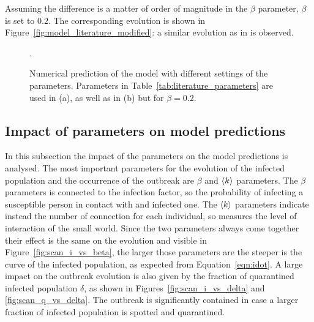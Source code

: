Assuming the difference is a matter of order of magnitude in the $\beta$ parameter, $\beta$ is set to $0.2$. The corresponding evolution is shown in Figure~\ref{fig:model_literature_modified}: a similar evolution as in \cite{MingLiu} is observed.

\begin{figure}[!ht]\centering
{}
\caption{Numerical prediction of the model with different settings of the parameters. Parameters in Table~\ref{tab:literature_parameters} are used in (a), as well as in (b) but for $\beta=0.2$.}.
\end{figure}


\subsection{Impact of parameters on model predictions}
In this subsection the impact of the parameters on the model predictions is analysed. The most important parameters for the evolution of the infected population and the occurrence of the outbreak are $\beta$ and $\braket{k}$ parameters. The $\beta$ parameters is connected to the infection factor, so the probability of infecting a susceptible person in contact with and infected one. The $\braket{k}$ parameters indicate instead the number of connection for each individual, so measures the level of interaction of the small world. Since the two parameters always come together their effect is the same on the evolution and visible in Figure~\ref{fig:scan_i_vs_beta}, the larger those parameters are the steeper is the curve of the infected population, as expected from Equation~\ref{eqn:idot}.  A large impact on the outbreak evolution is also given by the fraction of quarantined infected population $\delta$, as shown in Figures~\ref{fig:scan_i_vs_delta} and \ref{fig:scan_q_vs_delta}. The outbreak is significantly contained in case a larger fraction of infected population is spotted and quarantined.

